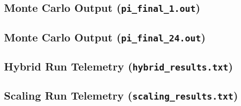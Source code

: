 \documentclass[11pt]{article}
\begin{document}
\subsection{Monte Carlo Output (\texttt{pi\_final\_1.out})}


\subsection{Monte Carlo Output (\texttt{pi\_final\_24.out})}


\subsection{Hybrid Run Telemetry (\texttt{hybrid\_results.txt})}


\subsection{Scaling Run Telemetry (\texttt{scaling\_results.txt})}

\end{document}
